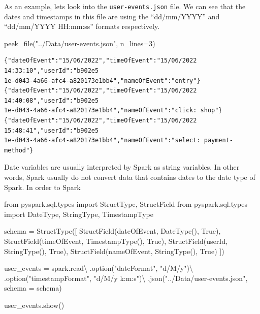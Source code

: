 \documentclass[
  11pt,
  letterpaper,
  DIV=11,
  numbers=noendperiod]{scrreprt}
\newenvironment{Shaded}{\begin{snugshade}}{\end{snugshade}}
\newcommand{\DecValTok}[1]{\textcolor[rgb]{0.68,0.00,0.00}{#1}}
\newcommand{\ImportTok}[1]{\textcolor[rgb]{0.00,0.46,0.62}{#1}}
\newcommand{\NormalTok}[1]{\textcolor[rgb]{0.00,0.23,0.31}{#1}}
\newcommand{\OperatorTok}[1]{\textcolor[rgb]{0.37,0.37,0.37}{#1}}
\newcommand{\StringTok}[1]{\textcolor[rgb]{0.13,0.47,0.30}{#1}}
\newcommand{\VariableTok}[1]{\textcolor[rgb]{0.07,0.07,0.07}{#1}}
\begin{document}
As an example, lets look into the \texttt{user-events.json} file. We can
see that the dates and timestamps in this file are using the
``dd/mm/YYYY'' and ``dd/mm/YYYY HH:mm:ss'' formats respectively.

\begin{Shaded}
\begin{Highlighting}[]
\NormalTok{peek\_file(}\StringTok{"../Data/user{-}events.json"}\NormalTok{, n\_lines}\OperatorTok{=}\DecValTok{3}\NormalTok{)}
\end{Highlighting}
\end{Shaded}

\begin{verbatim}
{"dateOfEvent":"15/06/2022","timeOfEvent":"15/06/2022 14:33:10","userId":"b902e5
1e-d043-4a66-afc4-a820173e1bb4","nameOfEvent":"entry"}
{"dateOfEvent":"15/06/2022","timeOfEvent":"15/06/2022 14:40:08","userId":"b902e5
1e-d043-4a66-afc4-a820173e1bb4","nameOfEvent":"click: shop"}
{"dateOfEvent":"15/06/2022","timeOfEvent":"15/06/2022 15:48:41","userId":"b902e5
1e-d043-4a66-afc4-a820173e1bb4","nameOfEvent":"select: payment-method"}
\end{verbatim}

Date variables are usually interpreted by Spark as string variables. In
other words, Spark usually do not convert data that contains dates to
the date type of Spark. In order to Spark

\begin{Shaded}
\begin{Highlighting}[]
\ImportTok{from}\NormalTok{ pyspark.sql.types }\ImportTok{import}\NormalTok{ StructType, StructField}
\ImportTok{from}\NormalTok{ pyspark.sql.types }\ImportTok{import}\NormalTok{ DateType, StringType, TimestampType}

\NormalTok{schema }\OperatorTok{=}\NormalTok{ StructType([}
\NormalTok{  StructField(}\StringTok{\textquotesingle{}dateOfEvent\textquotesingle{}}\NormalTok{, DateType(), }\VariableTok{True}\NormalTok{),}
\NormalTok{  StructField(}\StringTok{\textquotesingle{}timeOfEvent\textquotesingle{}}\NormalTok{, TimestampType(), }\VariableTok{True}\NormalTok{),}
\NormalTok{  StructField(}\StringTok{\textquotesingle{}userId\textquotesingle{}}\NormalTok{, StringType(), }\VariableTok{True}\NormalTok{),}
\NormalTok{  StructField(}\StringTok{\textquotesingle{}nameOfEvent\textquotesingle{}}\NormalTok{, StringType(), }\VariableTok{True}\NormalTok{)}
\NormalTok{])}

\NormalTok{user\_events }\OperatorTok{=}\NormalTok{ spark.read}\OperatorTok{\textbackslash{}}
\NormalTok{  .option(}\StringTok{"dateFormat"}\NormalTok{, }\StringTok{"d/M/y"}\NormalTok{)}\OperatorTok{\textbackslash{}}
\NormalTok{  .option(}\StringTok{"timestampFormat"}\NormalTok{, }\StringTok{"d/M/y k:m:s"}\NormalTok{)}\OperatorTok{\textbackslash{}}
\NormalTok{  .json(}\StringTok{"../Data/user{-}events.json"}\NormalTok{, schema }\OperatorTok{=}\NormalTok{ schema)}
  
\NormalTok{user\_events.show()}
\end{Highlighting}
\end{Shaded}
\end{document}

